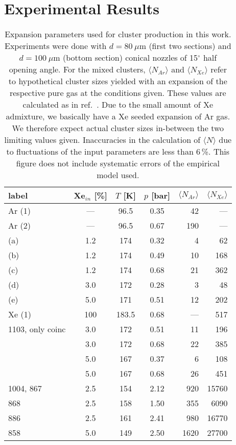 \section{Experimental Results}
\begin{table}
\caption{
Expansion parameters used for cluster production in this work. Experiments were done with $d = 80~\mu$m (first two sections) and $d = 100~\mu$m (bottom section) conical nozzles of 15$^\circ$ half opening angle. For the mixed clusters, $\langle N_{Ar} \rangle$ and $\langle N_{Xe} \rangle$ refer to hypothetical cluster sizes yielded with an expansion of the respective pure gas at the conditions given. These values are calculated as in ref.\ \protect{}. Due to the small amount of Xe admixture, we basically have a Xe seeded expansion of Ar gas. We therefore expect actual cluster sizes in-between the two limiting values given. Inaccuracies in the calculation of $\langle N\rangle$ due to fluctuations of the input parameters are less than 6\,\%. This figure does not include systematic errors of the empirical model used.
}
\label{table:cluster}

\begin{tabular}{l c c c r r}
%
\toprule
  label  &  Xe$_{in}$ [\%]  &  $T$ [K]  &  $p$ [bar] & $\langle N_{Ar} \rangle$ & $\langle N_{Xe} \rangle$ \\
%
\midrule
Ar (1)  & --- &  96.5  & 0.35  &  42  &  --- \\
Ar (2)  & --- &  96.5  & 0.67  & 190  &  --- \\
 (a) & 1.2 &  174   & 0.32  &   4  &   62 \\
 (b) & 1.2 &  174   & 0.49  &  10  &  168 \\
 (c) & 1.2 &  174   & 0.68  &  21  &  362 \\
 (d) & 3.0 &  172   & 0.28  &   3  &   48 \\
 (e) & 5.0 &  171   & 0.51  &  12  &  202 \\
Xe (1)  & 100 & 183.5  & 0.68  & ---  &  517 \\     
\midrule
1103, only coinc  & 3.0 &  172   & 0.51  &  11  &  196 \\
  & 3.0 &  172   & 0.68  &  22  &  385 \\
  & 5.0 &  167   & 0.37  &   6  &  108 \\
  & 5.0 &  167   & 0.68  &  26  &  451 \\
\midrule
1004, 867  & 2.5 &  154   & 2.12  &  920 & 15760\\
868  & 2.5 &  158   & 1.50  &  355 &  6090\\
886  & 2.5 &  161   & 2.41  &  980 & 16770\\
858  & 5.0 &  149   & 2.50  & 1620 & 27700\\
%
\bottomrule
\end{tabular}
\end{table}



